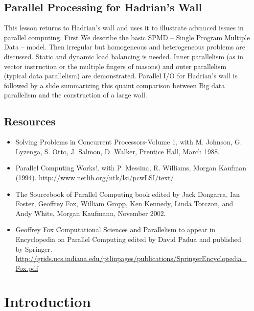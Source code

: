 
\subsection{Parallel Processing for Hadrian's Wall}

This lesson returns to Hadrian's wall and uses it to illustrate advanced
issues in parallel computing. First We describe the basic SPMD -- Single
Program Multiple Data -- model. Then irregular but homogeneous and
heterogeneous problems are discussed. Static and dynamic load balancing
is needed. Inner parallelism (as in vector instruction or the multiple
fingers of masons) and outer parallelism (typical data parallelism) are
demonstrated. Parallel I/O for Hadrian's wall is followed by a slide
summarizing this quaint comparison between Big data parallelism and the
construction of a large wall.


\subsection{Resources}\label{resources}

\begin{itemize}
\item
  Solving Problems in Concurrent Processors-Volume 1, with M. Johnson,
  G. Lyzenga, S. Otto, J. Salmon, D. Walker, Prentice Hall, March 1988.
\item
  Parallel Computing Works!, with P. Messina, R. Williams, Morgan
  Kaufman (1994). \url{http://www.netlib.org/utk/lsi/pcwLSI/text/}
\item
  The Sourcebook of Parallel Computing book edited by Jack Dongarra, Ian
  Foster, Geoffrey Fox, William Gropp, Ken Kennedy, Linda Torczon, and
  Andy White, Morgan Kaufmann, November 2002.
\item
  Geoffrey Fox Computational Sciences and Parallelism to appear in
  Encyclopedia on Parallel Computing edited by David Padua and published
  by Springer.
  \url{http://grids.ucs.indiana.edu/ptliupages/publications/SpringerEncyclopedia_Fox.pdf}
\end{itemize}

\section{Introduction}

